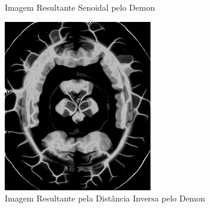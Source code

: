 \documentclass[]{spie}  %
\begin{document}
\begin{figure}[h]
\begin{subfigure}[t]{0.16\textwidth}
	  \caption{Imagem Resultante Senoidal pelo Demon}
	  \label{fig:sin-image-demon}
	\end{subfigure}
	\begin{subfigure}[t]{0.16\textwidth}
	  \includegraphics[width=\textwidth]{../images/resultDistDemons.png}
	  \caption{Imagem Resultante pela Distância Inversa pelo Demon}
	  \label{fig:dist-image-demon}
	\end{subfigure}
	\begin{subfigure}[t]{0.16\textwidth}

\end{subfigure}
\end{figure}
\end{document}
